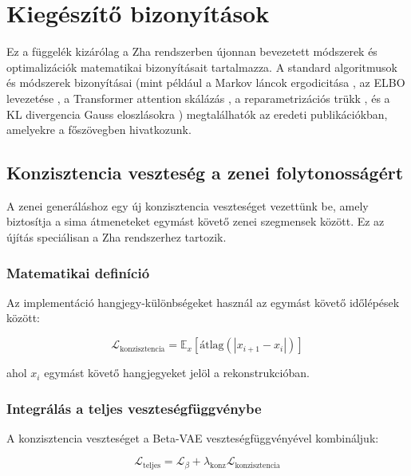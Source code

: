 \chapter{Kiegészítő bizonyítások}
\label{chap:proofs}

Ez a függelék kizárólag a Zha rendszerben újonnan bevezetett módszerek és optimalizációk matematikai bizonyításait tartalmazza. A standard algoritmusok és módszerek bizonyításai (mint például a Markov láncok ergodicitása \cite{norris1998markov}, az ELBO levezetése \cite{kingma2014auto}, a Transformer attention skálázás \cite{vaswani2017attention}, a reparametrizációs trükk \cite{kingma2014auto,rezende2014stochastic}, és a KL divergencia Gauss eloszlásokra \cite{kullback1951information}) megtalálhatók az eredeti publikációkban, amelyekre a főszövegben hivatkozunk.

\section{Konzisztencia veszteség a zenei folytonosságért}
\label{proof:consistency_loss}

A zenei generáláshoz egy új konzisztencia veszteséget vezettünk be, amely biztosítja a sima átmeneteket egymást követő zenei szegmensek között. Ez az újítás speciálisan a Zha rendszerhez tartozik.

\subsection{Matematikai definíció}

Az implementáció hangjegy-különbségeket használ az egymást követő időlépések között:

\begin{equation}
\mathcal{L}_{\text{konzisztencia}} = \mathbb{E}_{x} \left[ \text{átlag}(|x_{i+1} - x_i|) \right]
\end{equation}

ahol $x_i$ egymást követő hangjegyeket jelöl a rekonstrukcióban.

\subsection{Integrálás a teljes veszteségfüggvénybe}

A konzisztencia veszteséget a Beta-VAE veszteségfüggvényével kombináljuk:

\begin{equation}
\mathcal{L}_{\text{teljes}} = \mathcal{L}_{\beta} + \lambda_{\text{konz}} \mathcal{L}_{\text{konzisztencia}}
\end{equation}

